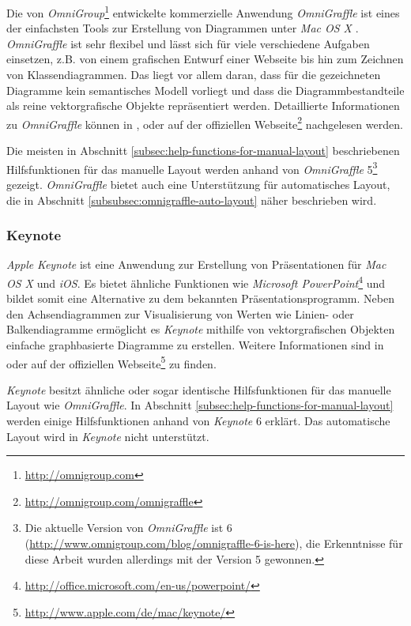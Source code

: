 Die von \textit{OmniGroup}\footnote{\url{http://omnigroup.com}} entwickelte kommerzielle Anwendung \textit{OmniGraffle} ist eines der einfachsten Tools zur Erstellung von Diagrammen unter \textit{Mac OS X} \cite{Olsen10OmniGraffle}. \textit{OmniGraffle} ist sehr flexibel und lässt sich für viele verschiedene Aufgaben einsetzen, z.B. von einem grafischen Entwurf einer Webseite bis hin zum Zeichnen von Klassendiagrammen. Das liegt vor allem daran, dass für die gezeichneten Diagramme kein semantisches Modell vorliegt und dass die Diagrammbestandteile als reine vektorgrafische Objekte repräsentiert werden. Detaillierte Informationen zu \textit{OmniGraffle} können in \cite{08OmniGraffle}, \cite{Olsen10OmniGraffle} oder auf der offiziellen Webseite\footnote{\url{http://omnigroup.com/omnigraffle}} nachgelesen werden.

Die meisten in Abschnitt \ref{subsec:help-functions-for-manual-layout} beschriebenen Hilfsfunktionen für das manuelle Layout werden anhand von \textit{OmniGraffle} 5\footnote{Die aktuelle Version von \textit{OmniGraffle} ist 6 (\url{http://www.omnigroup.com/blog/omnigraffle-6-is-here}), die Erkenntnisse für diese Arbeit wurden allerdings mit der Version 5 gewonnen.} gezeigt. \textit{OmniGraffle} bietet auch eine Unterstützung für automatisches Layout, die in Abschnitt \ref{subsubsec:omnigraffle-auto-layout} näher beschrieben wird.

\subsubsection{Keynote}
\label{subsubsec:keynote}

\textit{Apple} \textit{Keynote} ist eine Anwendung zur Erstellung von Präsentationen für \textit{Mac OS X} und \textit{iOS}. Es bietet ähnliche Funktionen wie \textit{Microsoft PowerPoint}\footnote{\url{http://office.microsoft.com/en-us/powerpoint/}} und bildet somit eine Alternative zu dem bekannten Präsentationsprogramm. Neben den Achsendiagrammen zur Visualisierung von Werten wie Linien- oder Balkendiagramme ermöglicht es \textit{Keynote} mithilfe von vektorgrafischen Objekten einfache graphbasierte Diagramme zu erstellen. Weitere Informationen sind in \cite{11Keynote} oder auf der offiziellen Webseite\footnote{\url{http://www.apple.com/de/mac/keynote/}} zu finden. 

\textit{Keynote} besitzt ähnliche oder sogar identische Hilfsfunktionen für das manuelle Layout wie \textit{OmniGraffle}. In Abschnitt \ref{subsec:help-functions-for-manual-layout} werden einige Hilfsfunktionen anhand von \textit{Keynote} 6 erklärt. Das automatische Layout wird in \textit{Keynote} nicht unterstützt.

